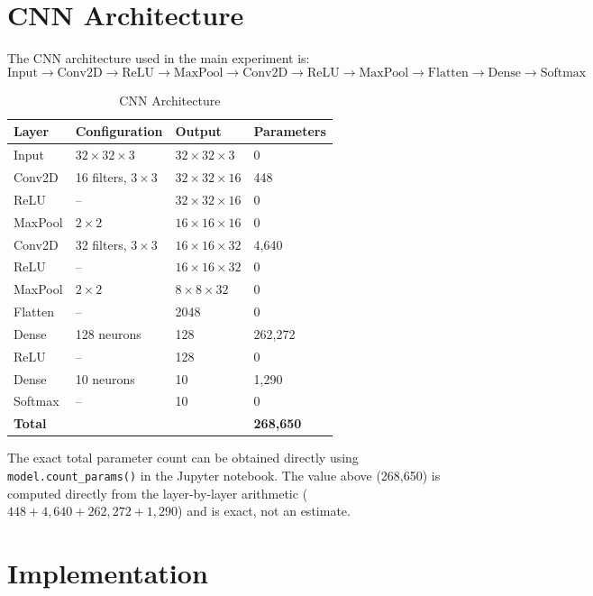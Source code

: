 \documentclass[11pt]{article}
\begin{document}
\section{CNN Architecture}
The CNN architecture used in the main experiment is:
\[
\text{Input} \rightarrow \text{Conv2D} \rightarrow \text{ReLU} \rightarrow \text{MaxPool} \rightarrow \text{Conv2D} \rightarrow \text{ReLU} \rightarrow \text{MaxPool} \rightarrow \text{Flatten} \rightarrow \text{Dense} \rightarrow \text{Softmax}
\]

\begin{table}[h]
\centering
\caption{CNN Architecture}
\begin{tabular}{|l|l|l|l|}
\hline
\textbf{Layer} & \textbf{Configuration} & \textbf{Output} & \textbf{Parameters} \\
\hline
Input & $32 \times 32 \times 3$ & $32 \times 32 \times 3$ & 0 \\
Conv2D & 16 filters, $3\times3$ & $32 \times 32 \times 16$ & 448 \\
ReLU & -- & $32 \times 32 \times 16$ & 0 \\
MaxPool & $2\times2$ & $16 \times 16 \times 16$ & 0 \\
Conv2D & 32 filters, $3\times3$ & $16 \times 16 \times 32$ & 4,640 \\
ReLU & -- & $16 \times 16 \times 32$ & 0 \\
MaxPool & $2\times2$ & $8 \times 8 \times 32$ & 0 \\
Flatten & -- & 2048 & 0 \\
Dense & 128 neurons & 128 & 262,272 \\
ReLU & -- & 128 & 0 \\
Dense & 10 neurons & 10 & 1,290 \\
Softmax & -- & 10 & 0 \\
\hline
\textbf{Total} & & & \textbf{268,650} \\
\hline
\end{tabular}
\end{table}

The exact total parameter count can be obtained directly using \texttt{model.count\_params()} in the Jupyter notebook. The value above (268,650) is computed directly from the layer-by-layer arithmetic ($448 + 4{,}640 + 262{,}272 + 1{,}290$) and is exact, not an estimate.

\section{Implementation}
\end{document}
